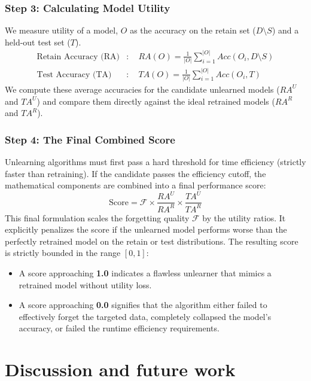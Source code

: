 \documentclass{article}
\begin{document}
\subsubsection*{Step 3: Calculating Model Utility}
We measure utility of a model, $O$ as the accuracy on the retain set ($D \setminus S$) and a held-out test set ($T$). 
\begin{align}
    \text{Retain Accuracy (RA)}&: \quad RA(O) = \frac{1}{|O|} \sum_{i=1}^{|O|} Acc(O_i, D \setminus S) \\
    \text{Test Accuracy (TA)}&: \quad TA(O) = \frac{1}{|O|} \sum_{i=1}^{|O|} Acc(O_i, T)
\end{align}
We compute these average accuracies for the candidate unlearned models ($RA^U$ and $TA^U$) and compare them directly against the ideal retrained models ($RA^R$ and $TA^R$).

\subsubsection*{Step 4: The Final Combined Score}
Unlearning algorithms must first pass a hard threshold for time efficiency (strictly faster than retraining). If the candidate passes the efficiency cutoff, the mathematical components are combined into a final performance score:
\begin{equation}
    \text{Score} = \mathcal{F} \times \frac{RA^U}{RA^R} \times \frac{TA^U}{TA^R}
\end{equation}
This final formulation scales the forgetting quality $\mathcal{F}$ by the utility ratios. It explicitly penalizes the score if the unlearned model performs worse than the perfectly retrained model on the retain or test distributions. The resulting score is strictly bounded in the range $[0, 1]$:
\begin{itemize}
    \item A score approaching \textbf{1.0} indicates a flawless unlearner that mimics a retrained model without utility loss.
    \item A score approaching \textbf{0.0} signifies that the algorithm either failed to effectively forget the targeted data, completely collapsed the model's accuracy, or failed the runtime efficiency requirements.
\end{itemize}


\section{Discussion and future work}
\end{document}
